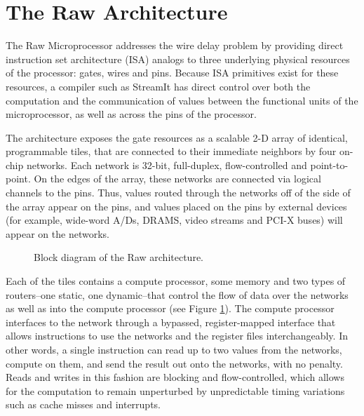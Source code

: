 \section{The Raw Architecture}
\label{sec:raw}

The Raw Microprocessor \cite{raw10,raw} addresses the wire delay
problem \cite{raw13} by providing direct instruction set architecture
(ISA) analogs to three underlying physical resources of the processor:
gates, wires and pins. Because ISA primitives exist for these
resources, a compiler such as StreamIt has direct control over both
the computation and the communication of values between the functional
units of the microprocessor, as well as across the pins of the
processor.

The architecture exposes the gate resources as a scalable 2-D array of
identical, programmable tiles, that are connected to their immediate
neighbors by four on-chip networks.  Each network is 32-bit,
full-duplex, flow-controlled and point-to-point. On the edges of the
array, these networks are connected via logical channels \cite{raw11}
to the pins.  Thus, values routed through the networks off of the side
of the array appear on the pins, and values placed on the pins by
external devices (for example, wide-word A/Ds, DRAMS, video streams
and PCI-X buses) will appear on the networks.

\begin{figure}[t]
\centering
{}
\caption{\protect\small Block diagram of the Raw architecture.
\protect\label{fig:raw-diagram}}
\vspace{-12pt}
\end{figure}

Each of the tiles contains a compute processor, some memory and two
types of routers--one static, one dynamic--that control the flow of
data over the networks as well as into the compute processor (see
Figure \ref{fig:raw-diagram}). The compute processor interfaces to the
network through a bypassed, register-mapped interface \cite{raw10}
that allows instructions to use the networks and the register files
interchangeably. In other words, a single instruction can read up to
two values from the networks, compute on them, and send the result out
onto the networks, with no penalty.  Reads and writes in this fashion
are blocking and flow-controlled, which allows for the computation to
remain unperturbed by unpredictable timing variations such as cache
misses and interrupts.

